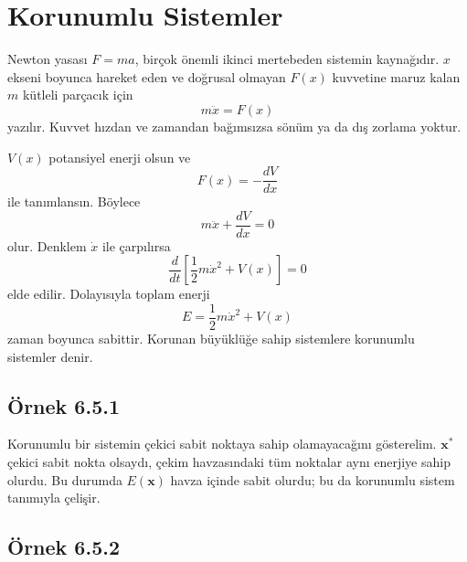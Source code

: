 \section{Korunumlu Sistemler}

\begin{justify}
Newton yasası $F=ma$, birçok önemli ikinci mertebeden sistemin kaynağıdır. $x$ ekseni boyunca hareket eden ve doğrusal olmayan $F(x)$ kuvvetine maruz kalan $m$ kütleli parçacık için
\begin{equation}
m\ddot{x}=F(x)
\end{equation}
yazılır. Kuvvet hızdan ve zamandan bağımsızsa sönüm ya da dış zorlama yoktur.

$V(x)$ potansiyel enerji olsun ve
\begin{equation}
F(x)=-\frac{dV}{dx}
\end{equation}
ile tanımlansın. Böylece
\begin{equation}
m\ddot{x}+\frac{dV}{dx}=0
\end{equation}
olur. Denklem $\dot{x}$ ile çarpılırsa
\begin{equation}
\frac{d}{dt}\left[\frac{1}{2}m\dot{x}^{2}+V(x)\right]=0
\end{equation}
elde edilir. Dolayısıyla toplam enerji
\begin{equation}
E=\frac{1}{2}m\dot{x}^{2}+V(x)
\end{equation}
zaman boyunca sabittir. Korunan büyüklüğe sahip sistemlere korunumlu sistemler denir.
\end{justify}

\subsection*{Örnek 6.5.1}

\begin{justify}
Korunumlu bir sistemin çekici sabit noktaya sahip olamayacağını gösterelim. $\mathbf{x}^{*}$ çekici sabit nokta olsaydı, çekim havzasındaki tüm noktalar aynı enerjiye sahip olurdu. Bu durumda $E(\mathbf{x})$ havza içinde sabit olurdu; bu da korunumlu sistem tanımıyla çelişir.
\end{justify}

\subsection*{Örnek 6.5.2}

